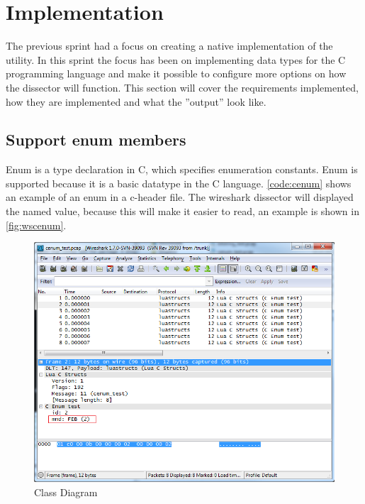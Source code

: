 \section{Implementation}

The previous sprint had a focus on creating a native implementation of the 
utility. In this sprint the focus has been on implementing data types for the 
C programming language and make it possible to configure more options on how 
the dissector will function. This section will cover the requirements 
implemented, how they are implemented and what the ''output'' look like.

\subsection{Support enum members}
Enum is a type declaration in C, which specifies enumeration constants.  Enum 
is supported because it is a basic datatype in the C language. 
\autoref{code:cenum} shows an example of an enum in a c-header file. The 
wireshark dissector will displayed the named value, because this will make it 
easier to read, an example is shown in \autoref{fig:wscenum}. 


\begin{figure}[ht]
	\center
	\includegraphics[width=\textwidth]{./sprints/img/wireshark_cenum}
	\caption{Class Diagram\label{fig:wscenum}}
\end{figure}


